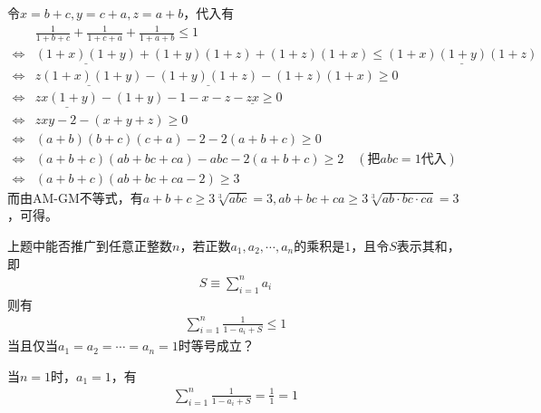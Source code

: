 令$x=b+c, y=c+a, z=a+b$，代入有
\begin{align*}
  & \frac1{1+b+c}+\frac1{1+c+a}+\frac1{1+a+b}\le 1\\
  \iff & \underline{(1+x)(1+y)} + (1+y)(1+z) + (1+z)(1+x) \le \underline{(1+x)(1+y)(1+z)}\\
  \iff & \underline{z(1+x)(1+y)} - \underline{(1+y)(1+z)} - (1+z)(1+x) \ge 0\\
  \iff & \underline{zx(1+y)} - (1+y) - 1-x-z-\underline{zx}\ge 0\\
  \iff & zxy - 2 - (x+y+z)\ge 0\\
  \iff & (a+b)(b+c)(c+a) - 2 - 2(a+b+c)\ge 0\\
  \iff & (a+b+c)(ab+bc+ca) - abc -2(a+b+c)\ge 2 \quad(\text{把}abc=1\text{代入})\\
  \iff & (a+b+c)(ab+bc+ca-2)\ge 3
\end{align*}
而由AM-GM不等式，有$a+b+c\ge 3\sqrt[3]{abc}=3, ab+bc+ca\ge 3\sqrt[3]{ab\cdot bc\cdot ca}=3$，可得。


\begin{question}
  上题中能否推广到任意正整数$n$，若正数$a_1,a_2,\cdots,a_n$的乘积是$1$，且令$S$表示其和，即
  \begin{align*}
    S\equiv\sum_{i=1}^n a_i
  \end{align*}
  则有
  \begin{align*}
    \sum_{i=1}^n \frac{1}{1 - a_i + S}\le 1
  \end{align*}
  当且仅当$a_1=a_2=\cdots=a_n=1$时等号成立？
\end{question}

当$n=1$时，$a_1=1$，有
\begin{align*}
  \sum_{i=1}^n \frac{1}{1 - a_i + S} = \frac{1}{1} = 1
\end{align*}

